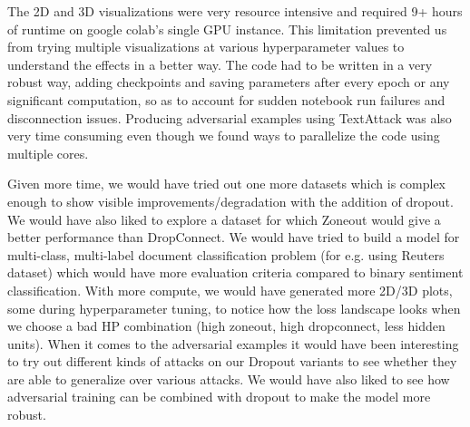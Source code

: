 \documentclass{article}
\begin{document}
The 2D and 3D visualizations were very resource intensive and required 9+ hours of runtime on google colab's single GPU instance. This limitation prevented us from trying multiple visualizations at various hyperparameter values to understand the effects in a better way. The code had to be written in a very robust way, adding checkpoints and saving parameters after every epoch or any significant computation, so as to account for sudden notebook run failures and disconnection issues. Producing adversarial examples using TextAttack was also very time consuming even though we found ways to parallelize the code using multiple cores.

Given more time, we would have tried out one more datasets which is complex enough to show visible improvements/degradation with the addition of dropout. We would have also liked to explore a dataset for which Zoneout would give a better performance than DropConnect. We would have tried to build a model for multi-class, multi-label document classification problem (for e.g. using Reuters dataset) which would have more evaluation criteria compared to binary sentiment classification. With more compute, we would have generated more 2D/3D plots, some during hyperparameter tuning, to notice how the loss landscape looks when we choose a bad HP combination (high zoneout, high dropconnect, less hidden units). When it comes to the adversarial examples it would have been interesting to try out different kinds of attacks on our Dropout variants to see whether they are able to generalize over various attacks. We would have also liked to see how adversarial training can be combined with dropout to make the model more robust.




\footnotesize

\end{document}
